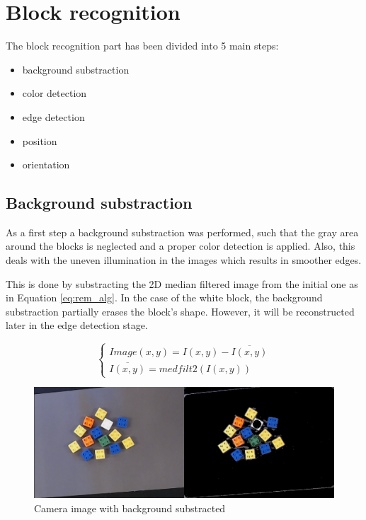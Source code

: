 
\chapter{Block recognition}\label{ch:block_recognition}

The block recognition part has been divided into 5 main steps: 
\begin{itemize}
  \item background substraction
  \item color detection
  \item edge detection
  \item position
  \item orientation
\end{itemize}

\section{Background substraction}
As a first step a background substraction was performed, such that the gray area around the blocks is neglected and a proper color detection is applied. Also, this deals with the uneven illumination in the images which results in smoother edges. 

This is done by substracting the 2D median filtered image from the initial one as in Equation \ref{eq:rem_alg}. In the case of the white block, the background substraction partially erases the block's shape. However, it will be reconstructed later in the edge detection stage. 

\begin{equation}\label{eq:rem_alg}
  \begin{cases}
    Image(x,y) = I(x,y) - \overline{I(x,y)} \\
    \overline{I(x,y)} = medfilt2(I(x,y))
  \end{cases}
\end{equation}

\begin{figure}[H]
  \centering
  \includegraphics[scale=0.35]{figures/remove_background.png}
  \caption{Camera image with background substracted}
  \label{fig:rem_back}
\end{figure}

